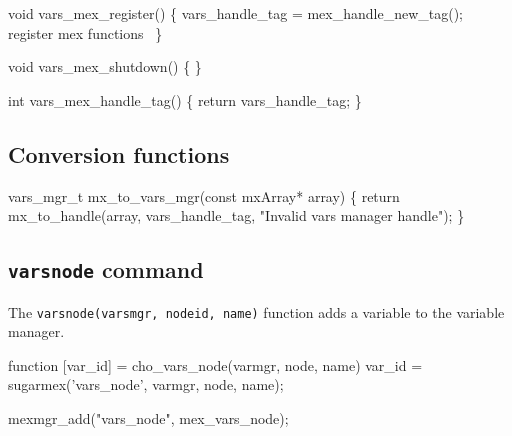 \nwendcode{}\nwdocspar

\nwenddocs{}\endmoddef
void vars_mex_register()
\{
    vars_handle_tag = mex_handle_new_tag();
    \LA{}register mex functions~{\nwtagstyle{}}\RA{}
\}

void vars_mex_shutdown()
\{
\}

int vars_mex_handle_tag()
\{
    return vars_handle_tag;
\}

\nwendcode{}\nwdocspar


\subsection{Conversion functions}

\nwenddocs{}\plusendmoddef
vars_mgr_t mx_to_vars_mgr(const mxArray* array)
\{
    return mx_to_handle(array, vars_handle_tag, "Invalid vars manager handle");
\}

\nwendcode{}\nwdocspar


\subsection{{\tt{}vars{}node} command}

The {\tt{}vars{}node(vars{}mgr,\ node{}id,\ name)} function adds a variable
to the variable manager.

\nwenddocs{}\endmoddef
function [var_id] = cho_vars_node(varmgr, node, name)
var_id = sugarmex('vars_node', varmgr, node, name);
\nwendcode{}\nwdocspar

\nwenddocs{}\endmoddef
mexmgr_add("vars_node", mex_vars_node);
\nwendcode{}\nwdocspar

